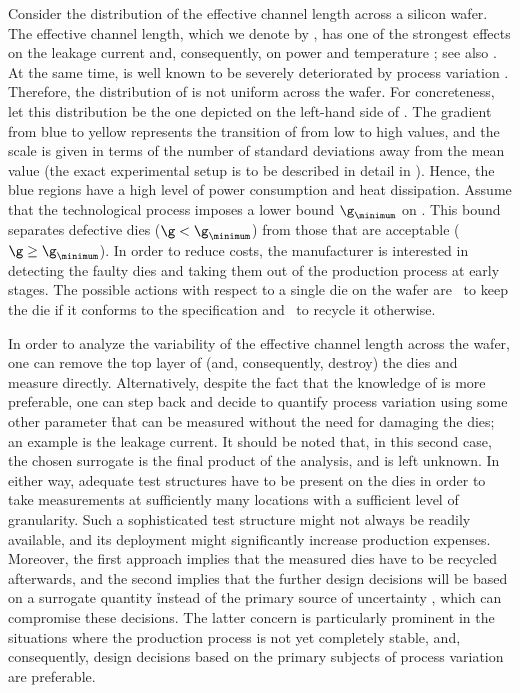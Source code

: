 Consider the distribution of the effective channel length across a silicon
wafer. The effective channel length, which we denote by \g, has one of the
strongest effects on the leakage current and, consequently, on power and
temperature \cite{juan2012}; see also . At the same time, \g
is well known to be severely deteriorated by process variation
\cite{chandrakasan2000, srivastava2010}. Therefore, the distribution of \g is
not uniform across the wafer. For concreteness, let this distribution be the one
depicted on the left-hand side of . The gradient from
blue to yellow represents the transition of \g from low to high values, and the
scale is given in terms of the number of standard deviations away from the mean
value (the exact experimental setup is to be described in detail in
). Hence, the blue regions have a high level of power
consumption and heat dissipation. Assume that the technological process imposes
a lower bound $\g_\minimum$ on \g. This bound separates defective dies ($\g <
\g_\minimum$) from those that are acceptable ($\g \geq \g_\minimum$). In order
to reduce costs, the manufacturer is interested in detecting the faulty dies and
taking them out of the production process at early stages. The possible actions
with respect to a single die on the wafer are \one~to keep the die if it
conforms to the specification and \two~to recycle it otherwise.

In order to analyze the variability of the effective channel length \g across
the wafer, one can remove the top layer of (and, consequently, destroy) the dies
and measure \g directly. Alternatively, despite the fact that the knowledge of
\g is more preferable, one can step back and decide to quantify process
variation using some other parameter \h that can be measured without the need
for damaging the dies; an example is the leakage current. It should be noted
that, in this second case, the chosen surrogate is the final product of the
analysis, and \g is left unknown. In either way, adequate test structures have
to be present on the dies in order to take measurements at sufficiently many
locations with a sufficient level of granularity. Such a sophisticated test
structure might not always be readily available, and its deployment might
significantly increase production expenses. Moreover, the first approach implies
that the measured dies have to be recycled afterwards, and the second implies
that the further design decisions will be based on a surrogate quantity \h
instead of the primary source of uncertainty \g, which can compromise these
decisions. The latter concern is particularly prominent in the situations where
the production process is not yet completely stable, and, consequently, design
decisions based on the primary subjects of process variation are preferable.

